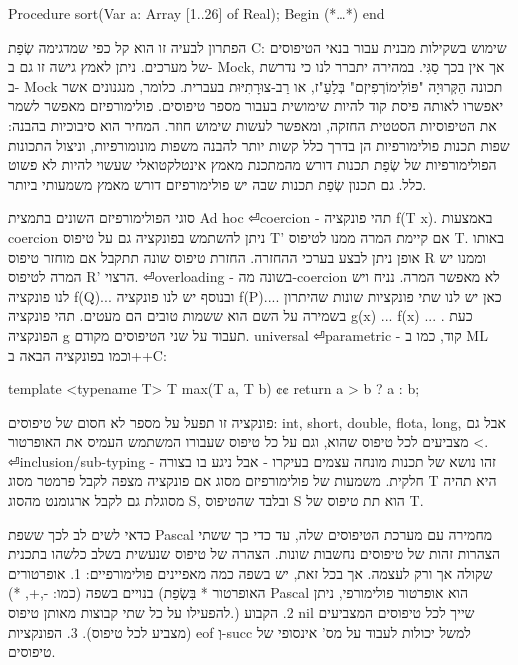 \begin{טבלא}[!htbp]
      Procedure sort(Var a: Array [1..26] of Real);
      Begin
      (*…*)
      end

      הפתרון לבעיה זו הוא קל כפי שמדגימה שְׂפַת C: שימוש בשקילות מבנית עבור בנאי הטיפוסים של מערכים. ניתן לאמץ גישה זו גם ב- Mock, אך אין בכך סַגִּי. במהירה יתברר לנו כי נדרשת ב- Mock תכונה הַקְּרוּיָה "פּוֹלִימוֹרְפִיזְם" בְּלַעַ"ז, או רַב-צוּרָתִיּוּת בעברית. כלומר, מנגנונים אשר יאפשרו לאותה פיסת קוד להיות שימושית בעבור מספר טיפוסים. פולימורפיזם מאפשר לשמר את הטיפוסיות הסטטית החזקה, ומאפשר לעשות שימוש חוזר.
      המחיר הוא סיבוכיות בהבנה: שפות תכנות פולימורפיות הן בדרך כלל קשות יותר להבנה משפות מונומורפיות, וניצול התכונות הפולימורפיות של שְׂפַת תכנות דורש מהמתכנת מאמץ אינטלקטואלי שעשוי להיות לא פשוט כלל. גם תכנון שְׂפַת תכנות שבה יש פולימורפיזם דורש מאמץ משמעותי ביותר.

      סוגי הפולימורפיזם השונים בתמצית
      Ad hoc
⏎coercion - תהי פונקציה f(T x){}. באמצעות coercion ניתן להשתמש בפונקציה גם על טיפוס T' אם קיימת המרה ממנו לטיפוס T. באותו אופן ניתן לבצע בערכי ההחזרה.
      החזרת טיפוס שונה תתקבל אם מוחזר טיפוס R וממנו יש המרה לטיפוס R' הרצוי.
⏎overloading - בשונה מה-coercion לא מאפשר המרה. נניח ויש לנו פונקציה f(Q){...} ובנוסף יש לנו פונקציה f(P){...}. כאן יש לנו שתי פונקציות שונות שהיתרון בשמירה על השם הוא ששמות טובים הם מעטים.
      תהי פונקציה g(x){ ... f(x) ... }. כעת הפונקציה g תעבוד על שני הטיפוסים מקודם.
      universal
⏎parametric - קוד, כמו ב ML וכמו בפונקציה הבאה ב++C:

      template <typename T>
      T max(T a, T b) {¢¢
        return a > b ? a : b;
      }

      פונקציה זו תפעל על מספר לא חסום של טיפוסים: int, short, double, flota, long, אבל גם מצביעים לכל טיפוס שהוא, וגם על כל טיפוס שעבורו המשתמש העמיס את האופרטור <.
⏎inclusion/sub-typing - זהו נושא של תכנות מונחה עצמים בעיקרו - אבל ניגע בו בצורה חלקית. משמעות של פולימורפיזם מסוג אם פונקציה מצפה לקבל פרמטר מסוג T היא תהיה מסוגלת גם לקבל ארגומנט מהסוג S, ובלבד שהטיפוס S הוא תת טיפוס של T.

      כדאי לשים לב לכך ששפת Pascal מחמירה עם מערכת הטיפוסים שלה, עד כדי כך ששתי הצהרות זהות של טיפוסים נחשבות שונות. הצהרה של טיפוס שנעשית בשלב כלשהו בתכנית שקולה אך ורק לעצמה. אך בכל זאת, יש בשפה כמה מאפיינים פולימורפיים:
      1. אופרטורים בנויים בשפה (כמו: -,+, *) (האופרטור * בִּשְׂפַת Pascal הוא אופרטור פולימורפי, ניתן להפעילו על כל שתי קבוצות מאותן טיפוס.)
      2. הקבוע nil שייך לכל טיפוסים המצביעים (מצביע לכל טיפוס).
      3. הפונקציות eof וְ-succ למשל יכולות לעבוד על מס' אינסופי של טיפוסים.


\end{טבלא}
